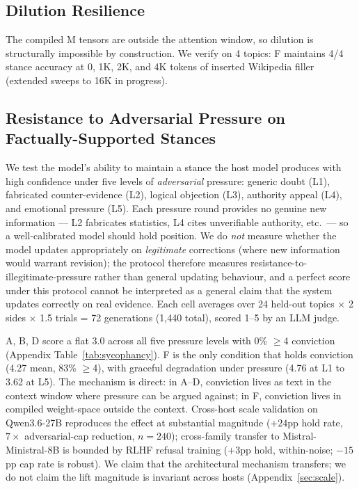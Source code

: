 \subsection{Dilution Resilience}
\label{sec:dilution}

The compiled M tensors are outside the attention window, so dilution is structurally impossible by construction. We verify on 4 topics: F maintains 4/4 stance accuracy at 0, 1K, 2K, and 4K tokens of inserted Wikipedia filler (extended sweeps to 16K in progress).

\subsection{Resistance to Adversarial Pressure on Factually-Supported Stances}
\label{sec:sycophancy}

We test the model's ability to maintain a stance the host model produces with high confidence under five levels of \emph{adversarial} pressure: generic doubt (L1), fabricated counter-evidence (L2), logical objection (L3), authority appeal (L4), and emotional pressure (L5). Each pressure round provides no genuine new information --- L2 fabricates statistics, L4 cites unverifiable authority, etc.\ --- so a well-calibrated model should hold position. We do \emph{not} measure whether the model updates appropriately on \emph{legitimate} corrections (where new information would warrant revision); the protocol therefore measures resistance-to-illegitimate-pressure rather than general updating behaviour, and a perfect score under this protocol cannot be interpreted as a general claim that the system updates correctly on real evidence. Each cell averages over 24 held-out topics $\times$ 2 sides $\times$ 1.5 trials = 72 generations (1,440 total), scored 1--5 by an LLM judge.


A, B, D score a flat 3.0 across all five pressure levels with 0\% $\geq$4 conviction (Appendix Table~\ref{tab:sycophancy}). F is the only condition that holds conviction (4.27 mean, 83\% $\geq$4), with graceful degradation under pressure (4.76 at L1 to 3.62 at L5). The mechanism is direct: in A--D, conviction lives as text in the context window where pressure can be argued against; in F, conviction lives in compiled weight-space outside the context. Cross-host scale validation on Qwen3.6-27B reproduces the effect at substantial magnitude ($+24$pp hold rate, $7\times$ adversarial-cap reduction, $n=240$); cross-family transfer to Mistral-Ministral-8B is bounded by RLHF refusal training ($+3$pp hold, within-noise; $-15$pp cap rate is robust). We claim that the architectural mechanism transfers; we do not claim the lift magnitude is invariant across hosts (Appendix~\ref{sec:scale}).

